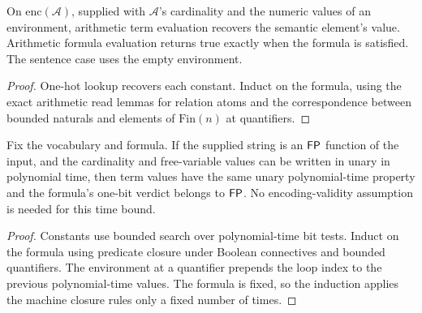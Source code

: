 \begin{theorem}
  \label{thm:desc-arithmetic-model-checking}
  \leanok
  On $\mathrm{enc}(\mathcal{A})$, supplied with $\mathcal{A}$'s cardinality and
  the numeric values of an environment, arithmetic term evaluation recovers the
  semantic element's value. Arithmetic formula evaluation returns true exactly
  when the formula is satisfied. The sentence case uses the empty environment.
\end{theorem}
\begin{proof}
  \leanok
  One-hot lookup recovers each constant. Induct on the formula, using the exact
  arithmetic read lemmas for relation atoms and the correspondence between
  bounded naturals and elements of $\mathrm{Fin}(n)$ at quantifiers.
\end{proof}

\begin{theorem}
  \label{thm:desc-arithmetic-model-checking-polytime}
  \leanok
  Fix the vocabulary and formula. If the supplied string is an $\mathsf{FP}$
  function of the input, and the cardinality and free-variable values can be
  written in unary in polynomial time, then term values have the same unary
  polynomial-time property and the formula's one-bit verdict belongs to
  $\mathsf{FP}$. No encoding-validity assumption is needed for this time bound.
\end{theorem}
\begin{proof}
  \leanok
  Constants use bounded search over polynomial-time bit tests. Induct on the
  formula using predicate closure under Boolean connectives and bounded
  quantifiers. The environment at a quantifier prepends the loop index to the
  previous polynomial-time values. The formula is fixed, so the induction
  applies the machine closure rules only a fixed number of times.
\end{proof}

